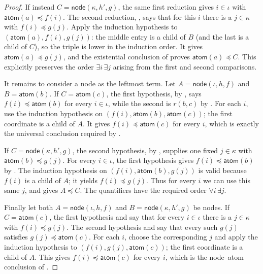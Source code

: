 \begin{proof}
If instead $C=\mathsf{node}(\kappa,h',g)$, the same first reduction gives
$i\in\iota$ with $\mathsf{atom}(a)\preceq f(i)$.  The second reduction,
, says that for this $i$ there is a
$j\in\kappa$ with $f(i)\preceq g(j)$.  Apply the induction hypothesis to
$(\mathsf{atom}(a),f(i),g(j))$: the middle entry is a child of $B$ (and the
last is a child of $C$), so the triple is lower in the induction order.
It gives $\mathsf{atom}(a)\preceq g(j)$, and the existential conclusion of
 proves $\mathsf{atom}(a)\preceq C$.  This
explicitly preserves the order $\exists i\,\exists j$ arising from the
first and second comparisons.

It remains to consider a node as the leftmost term.  Let
$A=\mathsf{node}(\iota,h,f)$ and $B=\mathsf{atom}(b)$.  If
$C=\mathsf{atom}(c)$, the first hypothesis, by
, says $f(i)\preceq\mathsf{atom}(b)$ for every
$i\in\iota$, while the second is $r(b,c)$ by
.  For each $i$, use the induction hypothesis on
$(f(i),\mathsf{atom}(b),\mathsf{atom}(c))$; the first coordinate is a child
of $A$.  It gives $f(i)\preceq\mathsf{atom}(c)$ for every $i$, which is
exactly the universal conclusion required by .

If $C=\mathsf{node}(\kappa,h',g)$, the second hypothesis, by
, supplies one fixed $j\in\kappa$ with
$\mathsf{atom}(b)\preceq g(j)$.  For every $i\in\iota$, the first
hypothesis gives $f(i)\preceq\mathsf{atom}(b)$ by
.  The induction hypothesis on
$(f(i),\mathsf{atom}(b),g(j))$ is valid because $f(i)$ is a child of $A$;
it yields $f(i)\preceq g(j)$.  Thus for every $i$ we can use this same $j$,
and  gives $A\preceq C$.  The quantifiers have
the required order $\forall i\,\exists j$.

Finally let both $A=\mathsf{node}(\iota,h,f)$ and
$B=\mathsf{node}(\kappa,h',g)$ be nodes.  If
$C=\mathsf{atom}(c)$, the first hypothesis and
 say that for every $i\in\iota$ there is a
$j\in\kappa$ with $f(i)\preceq g(j)$.  The second hypothesis and
 say that every such $g(j)$ satisfies
$g(j)\preceq\mathsf{atom}(c)$.  For each $i$, choose the corresponding
$j$ and apply the induction hypothesis to
$(f(i),g(j),\mathsf{atom}(c))$; the first coordinate is a child of $A$.
This gives $f(i)\preceq\mathsf{atom}(c)$ for every $i$, which is the
node--atom conclusion of .


\end{proof}
